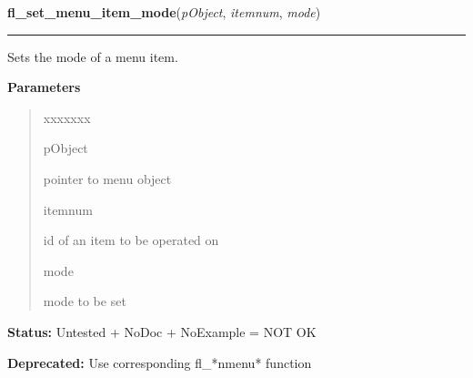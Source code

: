     \vspace{0.5ex}

\hspace{.8\funcindent}\begin{boxedminipage}{\funcwidth}

    \raggedright \textbf{fl\_set\_menu\_item\_mode}(\textit{pObject}, \textit{itemnum}, \textit{mode})

    \vspace{-1.5ex}

    \rule{\textwidth}{0.5\fboxrule}
\setlength{\parskip}{2ex}
    Sets the mode of a menu item.

\setlength{\parskip}{1ex}
      \textbf{Parameters}
      \vspace{-1ex}

      \begin{quote}
        \begin{Ventry}{xxxxxxx}

          \item[pObject]

          pointer to menu object

          \item[itemnum]

          id of an item to be operated on

          \item[mode]

          mode to be set

        \end{Ventry}

      \end{quote}

\textbf{Status:} Untested + NoDoc + NoExample = NOT OK



\textbf{Deprecated:} Use corresponding fl\_*nmenu* function



    \end{boxedminipage}

    \label{xformslib:library:fl_show_menu_symbol}

    \vspace{0.5ex}

